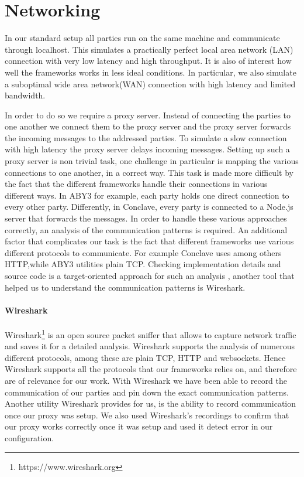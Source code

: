 \section{Networking}
In our standard setup all parties run on the same machine and communicate through localhost. This simulates a practically perfect local area network (LAN) connection with very low latency and high throughput. It is also of interest how well the frameworks works in less ideal conditions. In particular, we also simulate a suboptimal wide area network(WAN) connection with high latency and limited bandwidth.

In order to do so we require a proxy server. Instead of connecting the parties to one another we connect them to the proxy server and the proxy server forwards the incoming messages to the addressed parties. To simulate a slow connection with high latency the proxy server delays incoming messages. Setting up such a proxy server is non trivial task, one challenge in particular is mapping the various connections to one another, in a correct way. This task is made more difficult by the fact that the different frameworks handle their connections in various different ways. In ABY3 for example, each party holds one direct connection to every other party. Differently, in Conclave, every party is connected to a Node.js server that forwards the messages. In order to handle these various approaches correctly, an analysis of the communication patterns is required. An additional factor that complicates our task is the fact that different frameworks use various different protocols to communicate. For example Conclave uses among others HTTP,while ABY3 utilities plain TCP. Checking implementation details and source code is a target-oriented approach for such an analysis , another tool that helped us to understand the communication patterns is Wireshark.      
\paragraph{Wireshark}
Wireshark\footnote{https://www.wireshark.org} is an open source packet sniffer that allows to capture network traffic and saves it for a detailed analysis. Wireshark supports the analysis of numerous different protocols, among these are plain TCP, HTTP and websockets. Hence Wireshark supports all the protocols that our frameworks relies on, and therefore are of relevance for our work. With Wireshark we have been able to record the communication of our parties and pin down the exact communication patterns. Another utility Wireshark provides for us, is the ability to record communication once our proxy was setup. We also used Wireshark's recordings to confirm that our proxy works correctly once it was setup and used it detect error in our configuration. 
                

